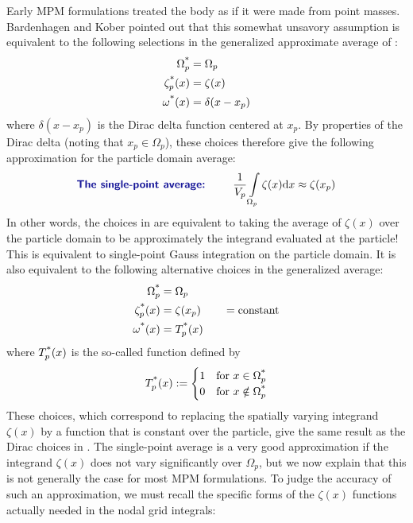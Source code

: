 Early MPM formulations treated the body as if it were made from point masses\cite{Sulsky1994}. Bardenhagen and Kober \cite{Bardenhagen2004} pointed out that this somewhat unsavory assumption is equivalent to the following selections in the generalized approximate average of  :
\begin{subequations}
\begin{align}
  \Omega_p^{\text{*}} &= \Omega_p
\\
  \zeta_p^{\text{*}}(x) &= \zeta(x)
\\
  \omega^{\text{*}}(x) &=\delta(x-x_p)
\end{align}
\label{eq:SulskyChoices}
\end{subequations}
where $\delta(x-x_p)$ is the Dirac delta function centered at $x_p$. By properties of the Dirac delta (noting that $x_p\in\Omega_p$), these choices therefore give the following approximation for the particle domain average:
\begin{equation}
\text{\Defn{The single-point average: }}\qquad
  \frac{1}{V_p}\int\limits_{\Omega_p} \zeta(x) \dd x
\approx
  \zeta(x_p)
\label{eq:SulskyAvg}
\end{equation}
In other words, the choices in  are equivalent to taking the average of $\zeta(x)$ over the particle domain to be approximately the integrand evaluated at the particle! This is equivalent to single-point Gauss integration on the particle domain.  It is also equivalent to the following alternative choices in the generalized average:
\begin{subequations}
\begin{align}
  \Omega_p^{\text{*}} &= \Omega_p
\\
  \zeta_p^{\text{*}}(x) &= \zeta(x_p)\qquad=\text{constant}
\\
  \omega^{\text{*}}(x) &=T_p^{\text{*}}(x)
\end{align}
\label{eq:ConstantChoices}
\end{subequations}
where $T_p^{\text{*}}(x)$ is the so-called  function defined by
\begin{equation}
  T_p^{\text{*}}(x):=\begin{cases}1 & \text{for }x\in\Omega_p^{\text{*}} \\
                                0 & \text{for }x\notin\Omega_p^{\text{*}}
                   \end{cases}
\end{equation}
These choices, which correspond to replacing the spatially varying integrand $\zeta(x)$ by a function that is constant over the particle, give the same result as the Dirac choices in .  The single-point average is a very good approximation if the integrand $\zeta(x)$ does not vary significantly over $\Omega_p$, but we now explain that this is not generally the case for most MPM formulations.  To judge the accuracy of such an approximation, we must recall the specific forms of the $\zeta(x)$ functions actually needed in the nodal grid integrals:
